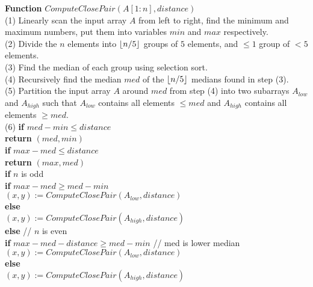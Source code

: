 \documentclass[11pt]{article}
\DeclarePairedDelimiter\floor{\lfloor}{\rfloor}
\begin{document}
\begin{enumerate}
  \textbf{Function} $ComputeClosePair(A[1:n], distance)$\\
  \-\hspace{2em} (1) Linearly scan the input array $A$ from left
  to right, find the minimum and maximum numbers, put them into
  variables $min$ and $max$ respectively.\\
  \-\hspace{2em} (2) Divide the $n$ elements into $\floor{n/5}$ groups of $5$ elements,
  and $\leq 1$ group of $<5$ elements.\\
  \-\hspace{2em} (3) Find the median of each group using selection sort.\\
  \-\hspace{2em} (4) Recursively find the median $med$ of the $\floor{n/5}$ medians
  found in step (3).\\
  \-\hspace{2em} (5) Partition the input array $A$ around $med$ from
  step (4) into two subarrays $A_{low}$ and $A_{high}$ such
  that $A_{low}$ contains all elements $\leq med$ and $A_{high}$ contains
  all elements $\geq med$.\\ 
  \-\hspace{2em} (6) \textbf{if} $med-min \leq distance$\\
  \-\hspace{5.5em} \textbf{return} $(med, min)$\\
  \-\hspace{3.75em} \textbf{if} $max-med \leq distance$\\
  \-\hspace{5.5em} \textbf{return} $(max, med)$\\
  \-\hspace{3.75em} \textbf{if} $n$ is odd\\
  \-\hspace{5.75em} \textbf{if} $max-med \geq med-min$\\
  \-\hspace{7.5em} $(x,y) := ComputeClosePair(A_{low}, distance)$\\
  \-\hspace{5.75em} \textbf{else} \\
  \-\hspace{7.5em} $(x,y) := ComputeClosePair(A_{high},
  distance)$\\
  \-\hspace{3.75em} \textbf{else} // $n$ is even\\
  \-\hspace{5.75em} \textbf{if} $max-med-distance \geq med-min$ // med is lower
  median \\
  \-\hspace{7.5em} $(x,y) := ComputeClosePair(A_{low}, distance)$\\
  \-\hspace{5.75em} \textbf{else} \\
  \-\hspace{7.5em} $(x,y) := ComputeClosePair(A_{high}, distance)$\\


\end{enumerate}
\end{document}
